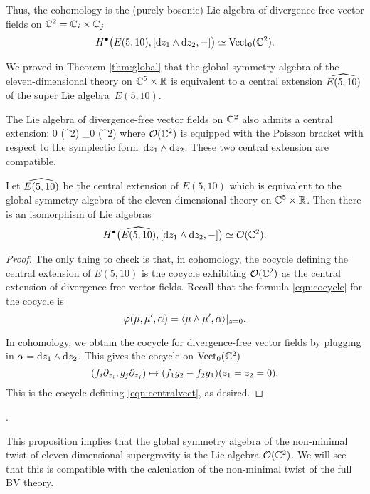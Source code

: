 Thus, the cohomology is the (purely bosonic) Lie algebra of divergence-free vector fields on $\CC^2 = \CC_i \times \CC_j$
\[
H^\bu\big(E(5,10), [\d z_1 \wedge \d z_2, -] \big) \simeq \Vect_0(\CC^2) .
\]

We proved in Theorem \ref{thm:global} that the global symmetry algebra of the eleven-dimensional theory on $\CC^5 \times \RR$ is equivalent to a central extension $\Hat{E(5,10)}$ of the super Lie algebra~$E(5,10)$. 

The Lie algebra of divergence-free vector fields on $\CC^2$ also admits a central extension:
\beqn\label{eqn:centralvect}
0 \to \CC \to \cO (\CC^2) \to \Vect_0 (\CC^2) 
\eeqn
where $\cO(\CC^2)$ is equipped with the Poisson bracket with respect to the symplectic form~$\d z_1 \wedge \d z_2$.
These two central extension are compatible. 


\begin{prop}
\label{prop:ham}
Let $\Hat{E(5,10)}$ be the central extension of $E(5,10)$ which is equivalent to the global symmetry algebra of the eleven-dimensional theory on $\CC^5 \times \RR$. 
Then there is an isomorphism of Lie algebras 
\[
H^\bu \big(\Hat{E(5,10)} , [\d z_1 \wedge \d z_2, -] \big) \simeq \cO(\CC^2) .
\]
\end{prop}
\begin{proof}
The only thing to check is that, in cohomology, the cocycle defining the central extension of $E(5,10)$ is the cocycle exhibiting $\cO(\CC^2)$ as the central extension of divergence-free vector fields. 
Recall that the formula \eqref{eqn:cocycle} for the cocycle is 
\[
\varphi(\mu, \mu', \alpha) = \<\mu \wedge \mu', \alpha\>|_{z=0}.
\]

In cohomology, we obtain the cocycle for divergence-free vector fields by plugging in $\alpha = \d z_1 \wedge \d z_2$. 
This gives the cocycle on $\Vect_0(\CC^2)$ 
\[
(f_i \del_{z_i}, g_j \del_{z_j}) \mapsto (f_1 g_2 - f_2 g_1)(z_1=z_2=0) .
\]
This is the cocycle defining \eqref{eqn:centralvect}, as desired. 
\end{proof}.

This proposition implies that the global symmetry algebra of the non-minimal twist of eleven-dimensional supergravity is the Lie algebra $\cO(\CC^2)$. 
We will see that this is compatible with the calculation of the non-minimal twist of the full BV theory. 

